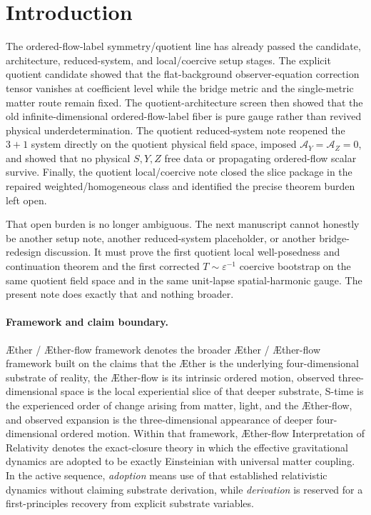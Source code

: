 \documentclass[11pt]{article}
\newcommand{\Aether}{\AE{}ther}
\newcommand{\Aflow}{\AE{}ther-flow}
\newcommand{\TheoryName}{\Aflow{} Interpretation of Relativity}
\newcommand{\TheoryProgram}{\Aether{} / \Aflow{} framework}
\newcommand{\AY}{\mathcal A_Y}
\newcommand{\AZ}{\mathcal A_Z}
\begin{document}
\begin{abstract}
At the present disciplined scope, this is the first actual quotient theorem note. The quotient branch now has a proved local well-posedness/continuation result and a proved corrected coercive bootstrap on the same quotient physical field space, with \(\AY=\AZ=0\) imposed from the outset and with no physical or analytic \(S,Y,Z\) data reintroduced. No reconsideration of the bridge metric or the single-metric matter route is forced at this theorem step.
\end{abstract}

\section{Introduction}

The ordered-flow-label symmetry/quotient line has already passed the candidate, architecture, reduced-system, and local/coercive setup stages. The explicit quotient candidate showed that the flat-background observer-equation correction tensor vanishes at coefficient level while the bridge metric and the single-metric matter route remain fixed. The quotient-architecture screen then showed that the old infinite-dimensional ordered-flow-label fiber is pure gauge rather than revived physical underdetermination. The quotient reduced-system note reopened the \(3+1\) system directly on the quotient physical field space, imposed \(\AY=\AZ=0\), and showed that no physical \(S,Y,Z\) free data or propagating ordered-flow scalar survive. Finally, the quotient local/coercive note closed the slice package in the repaired weighted/homogeneous class and identified the precise theorem burden left open.

That open burden is no longer ambiguous. The next manuscript cannot honestly be another setup note, another reduced-system placeholder, or another bridge-redesign discussion. It must prove the first quotient local well-posedness and continuation theorem and the first corrected \(T\sim\varepsilon^{-1}\) coercive bootstrap on the same quotient field space and in the same unit-lapse spatial-harmonic gauge. The present note does exactly that and nothing broader.

\paragraph{Framework and claim boundary.}
\TheoryProgram{} denotes the broader \Aether{} / \Aflow{} framework built on the claims that the \Aether{} is the underlying four-dimensional substrate of reality, the \Aflow{} is its intrinsic ordered motion, observed three-dimensional space is the local experiential slice of that deeper substrate, S-time is the experienced order of change arising from matter, light, and the \Aflow{}, and observed expansion is the three-dimensional appearance of deeper four-dimensional ordered motion. Within that framework, \TheoryName{} denotes the exact-closure theory in which the effective gravitational dynamics are adopted to be exactly Einsteinian with universal matter coupling. In the active sequence, \emph{adoption} means use of that established relativistic dynamics without claiming substrate derivation, while \emph{derivation} is reserved for a first-principles recovery from explicit substrate variables.
\end{document}
